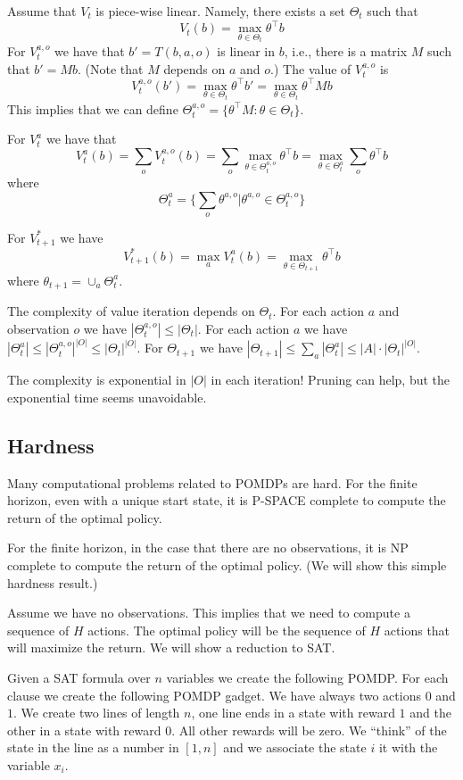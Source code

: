 Assume that $V_t$ is piece-wise linear. Namely, there exists a set
$\Theta_t$ such that
\[
V_t(b)=\max_{\theta\in\Theta_t}\theta^\top b
\]
For $V_t^{a,o}$ we have that $b'=T(b,a,o)$ is linear in $b$, i.e.,
there is a matrix $M$ such that $b'=Mb$. (Note that $M$ depends on
$a$ and $o$.) The value of $V_t^{a,o}$ is
\[
V_t^{a,o}(b')=\max_{\theta\in\Theta_t} \theta^\top b'=
\max_{\theta\in\Theta_t} \theta^\top M b
\]
This implies that we can define $\Theta_t^{a,o}=\{\theta^\top
M:\theta \in \Theta_t\}$.

For $V^a_t$ we have that
\[
V_t^a(b)=\sum_o V_t^{a,o}(b)=\sum_o \max_{\theta\in\Theta_t^{a,o}}
\theta^\top b=\max_{\theta\in\Theta_t^{a}}\sum_o  \theta^\top b
\]
where
\[
\Theta^a_t=\{\sum_o
\theta^{a,o}|\theta^{a,o}\in\Theta^{a,o}_t\}
\]

For $V_{t+1}^*$ we have
\[
V^*_{t+1}(b)=\max_a V_t^a(b)=\max_{\theta\in\Theta_{t+1}}
\theta^\top b
\]
where $\theta_{t+1}=\cup_a \Theta^a_t$.
%

The complexity of value iteration depends on $\Theta_t$. For each
action $a$ and observation $o$ we have $|\Theta^{a,o}_t|\leq
|\Theta_t|$. For each action $a$ we have $|\Theta^a_t|\leq
{|\Theta^{a,o}_t|}^{|O|}\leq {|\Theta_t|}^{|O|}$. For $\Theta_{t+1}$
we have $|\Theta_{t+1}|\leq \sum_a |\Theta_t^a|\leq |A|\cdot
|\Theta_t|^{|O|}$.

The complexity is exponential in $|O|$ in each iteration! Pruning
can help, but the exponential time seems unavoidable.

\subsection{Hardness}

Many computational problems related to POMDPs are hard. For the
finite horizon, even with a unique start state, it is P-SPACE
complete to compute the return of the optimal policy.

For the finite horizon, in the case that there are no observations,
it is NP complete to compute the return of the optimal policy. (We
will show this simple hardness result.)

Assume we have no observations. This implies that we need to compute
a sequence of $H$ actions. The optimal policy will be the sequence
of $H$ actions that will maximize the return. We will show a
reduction to SAT.

Given a SAT formula over $n$ variables we create the following
POMDP. For each clause we create the following POMDP gadget. We have
always two actions $0$ and $1$. We create two lines of length $n$,
one line ends in a state with reward $1$ and the other in a state
with reward $0$. All other rewards will be zero. We ``think'' of the
state in the line as a number in $[1,n]$ and we associate the state
$i$ it with the variable $x_i$.

